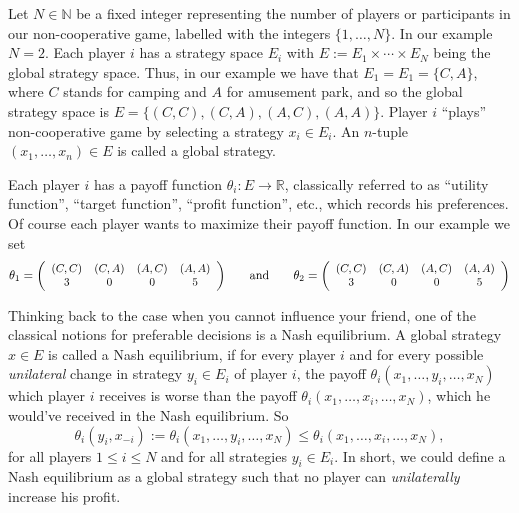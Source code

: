 \documentclass[a4paper,11pt,reqno,english]{amsart}
\theoremstyle{plain}
\theoremstyle{definition}
\newcommand\R{\mathbb{R}}
\begin{document}
\medskip
Let $N\in \mathbb{N}$ be a fixed integer representing the number of players or participants in our non-cooperative game, labelled with the integers $\{1,\dots,N\}$.
In our example $N=2$.
Each player $i$ has a strategy space $E_i$ with $E:= E_1\times\cdots\times E_N$ being the global strategy space.
Thus, in our example we have that $E_1=E_1=\{C, A\}$, where $C$ stands for camping and $A$ for amusement park, and so the global strategy space is $E=\{(C,C),(C,A),(A,C),(A,A)\}$.
Player $i$ ``plays'' non-cooperative game by selecting a strategy $x_i\in E_i$.
An $n$-tuple $(x_1,\dots,x_n)\in E$ is called a global strategy.
 
\medskip
Each player $i$ has a payoff function $\theta_i\colon E \longrightarrow \R$, classically referred to as ``utility function'', ``target function'', ``profit function'', etc., which records his preferences.
Of course each player wants to maximize their payoff function.
In our example we set
\begin{displaymath}
	\theta_1=
	{\small
	\left( \begin{array}{cccc}
			(C,C) & (C,A) & (A,C) & (A,A) \\
			3     & 0     & 0     & 5
		\end{array} \right)
	}
	\qquad\text{and}\qquad
	\theta_2=
	{\small
	\left( \begin{array}{cccc}
			(C,C) & (C,A) & (A,C) & (A,A) \\
			3     & 0     & 0     & 5
		\end{array} \right)
	}
\end{displaymath}

\medskip
Thinking back to the case when you cannot influence your friend,
one of the classical notions for preferable decisions is a Nash equilibrium.
A global strategy $x\in E$ is called a Nash equilibrium, if for every player $i$ and for every possible \textit{unilateral} change in strategy $y_i\in E_i$ of player $i$, the payoff $\theta_i(x_1,\dots,y_i,\dots,x_N)$ which player $i$ receives is worse than the payoff $\theta_i(x_1,\dots,x_i,\dots,x_N)$, which he would've received in the Nash equilibrium. So
\begin{displaymath}
	\theta_i(y_i,x_{-i}):= \theta_i(x_1,\dots,y_i,\dots,x_N) \leq \theta_i(x_1,\dots,x_i,\dots,x_N),
\end{displaymath}
for all players $1\leq i\leq N$ and for all strategies $y_i\in E_i$. In short, we could define a Nash equilibrium as a global strategy such that no player can \textit{unilaterally} increase his profit.
\end{document}
